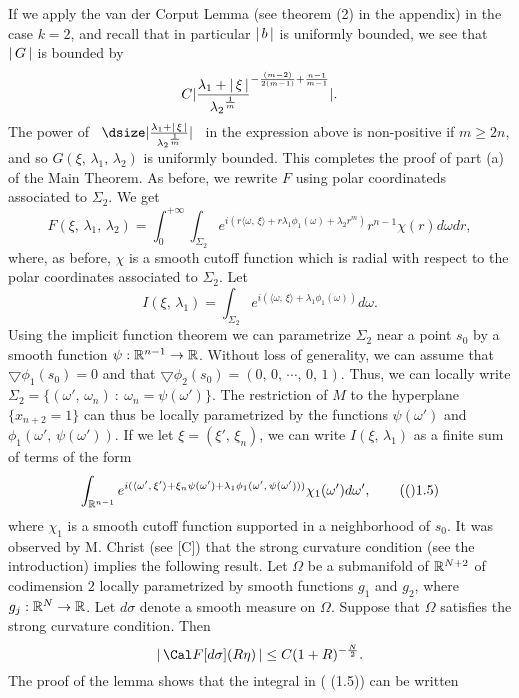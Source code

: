 If we apply the  van der  Corput Lemma 
(see theorem (2) in the appendix) in the case $k=2$, and  recall that 
in particular 
$\left\vert\,{b}\,\right\vert$ is uniformly bounded, we see that $\left\vert\,{G}\,\right\vert$ 
is bounded by 
$$
C\vert\frac{\lambda_1+\left\vert\,{\xi}\,\right\vert}{{\lambda_2}^{\frac{1}{m}}}^{-\frac{(m-2)}{2(m-1)}+
\frac{n-1}{m-1}}\vert.
$$
The power of \ $\dsize \vert\frac{\lambda_1+\n\xi}{{\lambda_2}^{\frac{1}{m}}}\vert$ \ in the expression above is non-positive if
$m\ge 2n$, and so 
$G(\xi,\,\lambda_1,\,\lambda_2)$ is uniformly
bounded. 
This completes the proof of part (a) of the Main Theorem.
\enddemo
%
\bigskip
{} As before, we rewrite $F$ 
using polar coordinateds associated to $\Sigma_2$. We get 
$$
F(\xi,\,\lambda_1,\,\lambda_2) =\int_0^{+\infty}\int_{\Sigma_2}e^{i(r\langle \omega,\,\xi
\rangle +r\lambda_1\phi_1(\omega)+\lambda_2r^m)}r^{n-1}\chi(r)d\omega dr,
$$
where, as before, $\chi$ is a smooth cutoff function which is radial with 
respect to the polar coordinates associated to $ \Sigma_2$.
Let 
$$
I(\xi,\,\lambda_1) = \int_{\Sigma_2} e^{i(\langle \omega,\,\xi
\rangle +\lambda_1\phi_1(\omega))}d\omega.
$$
Using the implicit function theorem   we can parametrize $\Sigma_2$  near a point $s_0$
by a smooth function 
$\psi: {\Bbb R}^{n-1}\to {\Bbb R}$. 
Without loss of generality,  we can assume that  $\bigtriangledown
\phi_1(s_0) = 0$ and that $\bigtriangledown
\phi_2(s_0) = (0,\, 0,\, \cdots,\,0,\,1)$. Thus, we can  locally
write $\Sigma_2 =\{(\omega',\,\omega_n) \ :\  \omega_n = \psi(\omega')\}.$ 
The restriction 
of $M$ to the hyperplane $\{x_{n+2}=1\}$ can thus be locally parametrized
by the functions $\psi(\omega')$ and $ \phi_1(\omega',\,\psi(\omega'))$.
If we let $\xi = (\xi',\,\xi_n)$, we can  write 
$I(\xi,\,\lambda_1)$ as a finite sum of terms of the form
$$
 \int_{\R^{n-1}} e^{i(\langle \omega',\,\xi'
\rangle +\xi_n\psi(\omega')+ \lambda_1\phi_1(\omega',\,\psi(\omega')))}
\chi_1(\omega')d\omega',
\tag  (1.5) $$
where $\chi_1$ is a smooth cutoff function supported in a neighborhood of
$s_0$.
It was observed by M. Christ (see [C]) that  the strong curvature 
condition  (see the introduction) implies the following result.
Let $\Omega$ be a submanifold of ${\Bbb R}^{N+2}$ of codimension $2$ locally
parametrized by smooth functions $g_1$ and $g_2$, where $g_j : {\Bbb R}^N\to {\Bbb R}$.
Let $d\sigma$ denote a smooth measure on $\Omega$. Suppose that $\Omega$
satisfies the strong curvature condition. Then 
$$
\n{{\Cal F}[d\sigma](R\eta) } \leq C(1+R)^{-\frac{N}{2}}.
$$
\endproclaim
The proof of the lemma shows that the integral in ( (1.5)) can be written 
